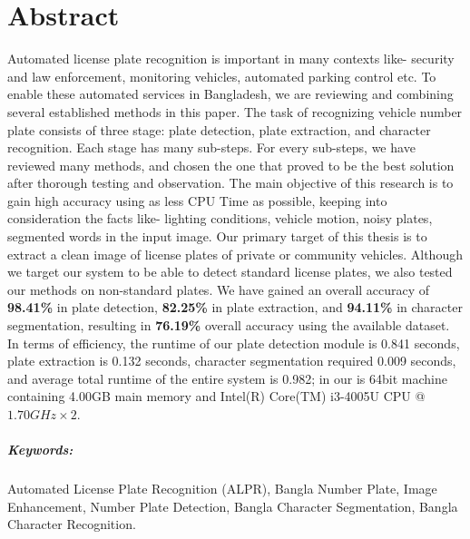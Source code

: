 \documentclass{standalone}
\begin{document}
\chapter*{Abstract}

Automated license plate recognition is important in many contexts like- security and law enforcement, monitoring vehicles, automated parking control etc. To enable these automated services in Bangladesh, we are reviewing and combining several established methods in this paper. The task of recognizing vehicle number plate consists of three stage: plate detection, plate extraction, and character recognition. Each stage has many sub-steps. For every sub-steps, we have reviewed many methods, and chosen the one that proved to be the best solution after thorough testing and observation. The main objective of this research is to gain high accuracy using as less CPU Time as possible, keeping into consideration the facts like- lighting conditions, vehicle motion, noisy plates, segmented words in the input image. Our primary target of this thesis is to extract a clean image of license plates of private or community vehicles. Although we target our system to be able to detect standard license plates, we also tested our methods on non-standard plates. We have gained an overall accuracy of {\bf 98.41\%} in plate detection, {\bf 82.25\%} in plate extraction, and {\bf 94.11\%} in character segmentation, resulting in {\bf 76.19\%} overall accuracy using the available dataset. In terms of efficiency, the runtime of our plate detection module is 0.841 seconds, plate extraction is 0.132 seconds, character segmentation required 0.009 seconds, and average total runtime of the entire system is 0.982; in our is 64bit machine containing 4.00GB main memory and Intel(R) Core(TM) i3-4005U CPU @ $1.70GHz \times 2$.

\vspace{1.0cm}

\paragraph*{Keywords:} Automated License Plate Recognition (ALPR), Bangla Number Plate, Image Enhancement, Number Plate Detection, Bangla Character Segmentation,  Bangla Character Recognition. 
\end{document}
